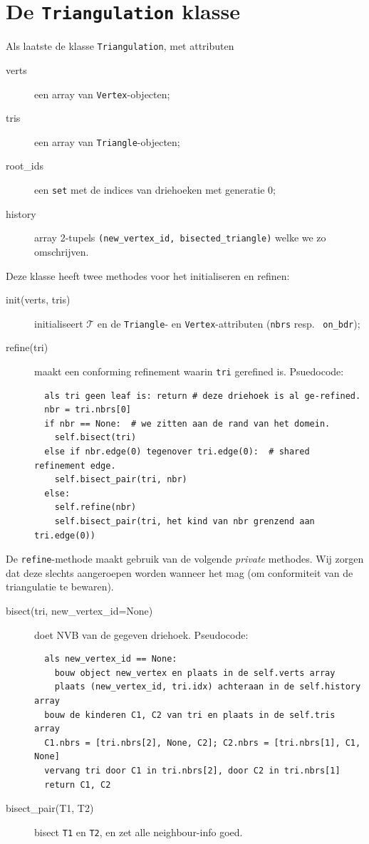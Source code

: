 \documentclass[11pt,a4paper]{amsart}
\theoremstyle{definition}
\newcommand{\T}{{\mathcal T}}
\begin{document}
\section*{De \texttt{Triangulation} klasse}
Als laatste de klasse \texttt{Triangulation}, met attributen
\begin{description}
  \item[verts] een array van \texttt{Vertex}-objecten;
  \item[tris] een array van \texttt{Triangle}-objecten;
  \item[root\_ids] een \texttt{set} met de indices van driehoeken met generatie 0;
  \item[history] array 2-tupels \texttt{(new\_vertex\_id, bisected\_triangle)} welke we zo omschrijven.
\end{description}
Deze klasse heeft twee methodes voor het initialiseren en refinen:
\begin{description}
  \item[init(verts, tris)] initialiseert $\T$ en de \texttt{Triangle}- en
    \texttt{Vertex}-attributen (\texttt{nbrs} resp.~ \texttt{on\_bdr});
  \item[refine(tri)] maakt een conforming refinement waarin \texttt{tri} gerefined is. Psuedocode:
\begin{verbatim}
  als tri geen leaf is: return # deze driehoek is al ge-refined.
  nbr = tri.nbrs[0]
  if nbr == None:  # we zitten aan de rand van het domein.
    self.bisect(tri)
  else if nbr.edge(0) tegenover tri.edge(0):  # shared refinement edge.
    self.bisect_pair(tri, nbr)
  else:
    self.refine(nbr)
    self.bisect_pair(tri, het kind van nbr grenzend aan tri.edge(0))
\end{verbatim}
\end{description}
De \texttt{refine}-methode maakt gebruik van de volgende \emph{private} methodes.
Wij zorgen dat deze slechts aangeroepen worden wanneer het mag (om conformiteit van de triangulatie te bewaren).
\begin{description}
  \item[bisect(tri, new\_vertex\_id=None)] doet NVB van de gegeven driehoek. Pseudocode:
\begin{verbatim}
  als new_vertex_id == None:
    bouw object new_vertex en plaats in de self.verts array
    plaats (new_vertex_id, tri.idx) achteraan in de self.history array
  bouw de kinderen C1, C2 van tri en plaats in de self.tris array
  C1.nbrs = [tri.nbrs[2], None, C2]; C2.nbrs = [tri.nbrs[1], C1, None]
  vervang tri door C1 in tri.nbrs[2], door C2 in tri.nbrs[1]
  return C1, C2
\end{verbatim}
  \item[bisect\_pair(T1, T2)] bisect \texttt{T1} en \texttt{T2}, en zet alle neighbour-info goed.
\end{description}
\end{document}

